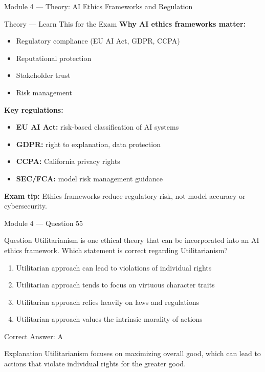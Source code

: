 \documentclass[aspectratio=169,10pt]{beamer}
\newcommand{\question}[1]{%
	\begin{block}{Question}
		#1
	\end{block}
}
\newcommand{\options}[4]{%
	\begin{enumerate}[label=\Alph*.,leftmargin=*]
		\item #1
		\item #2
		\item #3
		\item #4
	\end{enumerate}
}
\newcommand{\answerbox}[1]{%
	\begin{exampleblock}{Correct Answer: #1}
	\end{exampleblock}
}
\newcommand{\explain}[1]{%
	\begin{block}{Explanation}
		\small #1
	\end{block}
}
\newcommand{\theory}[1]{%
	\begin{block}{Theory --- Learn This for the Exam}
		\small #1
	\end{block}
}
\begin{document}
	\begin{frame}{Module 4 --- Theory: AI Ethics Frameworks and Regulation}
		\theory{
			\textbf{Why AI ethics frameworks matter:}
			\begin{itemize}
				\item Regulatory compliance (EU AI Act, GDPR, CCPA)
				\item Reputational protection
				\item Stakeholder trust
				\item Risk management
			\end{itemize}
			\textbf{Key regulations:}
			\begin{itemize}
				\item \textbf{EU AI Act:} risk-based classification of AI systems
				\item \textbf{GDPR:} right to explanation, data protection
				\item \textbf{CCPA:} California privacy rights
				\item \textbf{SEC/FCA:} model risk management guidance
			\end{itemize}
			\textbf{Exam tip:} Ethics frameworks reduce regulatory risk, not model accuracy or cybersecurity.
		}
	\end{frame}
	
	\begin{frame}{Module 4 --- Question 55}
		\question{Utilitarianism is one ethical theory that can be incorporated into an AI ethics framework. Which statement is correct regarding Utilitarianism?}
		\options{Utilitarian approach can lead to violations of individual rights}{Utilitarian approach tends to focus on virtuous character traits}{Utilitarian approach relies heavily on laws and regulations}{Utilitarian approach values the intrinsic morality of actions}
		\answerbox{A}
		\explain{Utilitarianism focuses on maximizing overall good, which can lead to actions that violate individual rights for the greater good.}
	\end{frame}
	
\end{document}
